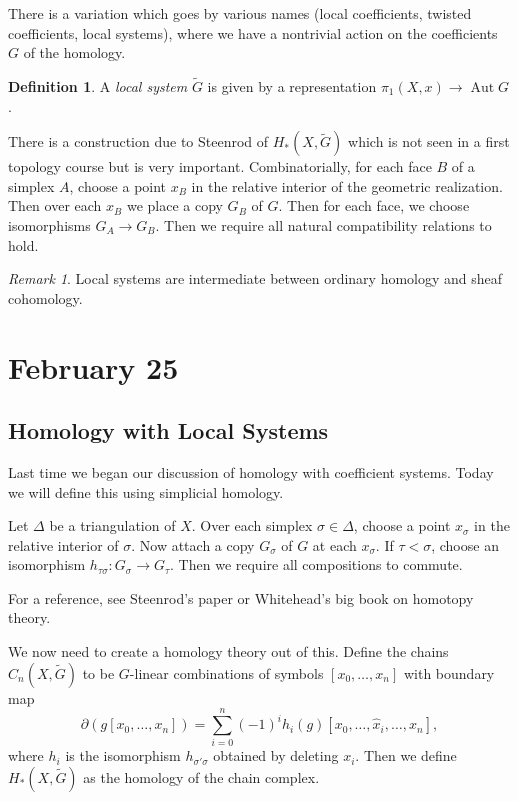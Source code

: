 \documentclass[leqno, openany]{memoir}
\theoremstyle{definition}
\newtheorem{defn}[thm]{Definition}
\theoremstyle{remark}
\newtheorem{rmk}[thm]{Remark}
\theoremstyle{plain}
\theoremstyle{definition}
\theoremstyle{remark}
\DeclareMathOperator{\Aut}{Aut}
\begin{document}
There is a variation which goes by various names (local coefficients, twisted coefficients, local systems), where we have a nontrivial action on the coefficients $G$ of the homology.

\begin{defn}
    A \textit{local system} $\widetilde{G}$ is given by a representation $\pi_1(X, x) \to \Aut G$.
\end{defn}

There is a construction due to Steenrod of $H_*(X, \widetilde{G})$ which is not seen in a first topology course but is very important. Combinatorially, for each face $B$ of a simplex $A$, choose a point $x_B$ in the relative interior of the geometric realization. Then over each $x_B$ we place a copy $G_B$ of $G$. Then for each face, we choose isomorphisms $G_A \to G_B$. Then we require all natural compatibility relations to hold.

\begin{rmk}
    Local systems are intermediate between ordinary homology and sheaf cohomology.
\end{rmk}

\chapter{February 25}%
\label{cha:february_25}

\section{Homology with Local Systems}%
\label{sec:homology_with_local_systems}

Last time we began our discussion of homology with coefficient systems. Today we will define this using simplicial homology.

Let $\Delta$ be a triangulation of $X$. Over each simplex $\sigma \in \Delta$, choose a point $x_{\sigma}$ in the relative interior of $\sigma$. Now attach a copy $G_{\sigma}$ of $G$ at each $x_{\sigma}$. If $\tau < \sigma$, choose an isomorphism $h_{\tau \sigma}: G_{\sigma} \to G_{\tau}$. Then we require all compositions to commute.

For a reference, see Steenrod's paper or Whitehead's big book on homotopy theory.

We now need to create a homology theory out of this. Define the chains $C_n(X, \widetilde{G})$ to be $G$-linear combinations of symbols $[x_0, \ldots, x_n]$ with boundary map
\[ \partial(g[x_0, \ldots, x_n]) = \sum_{i=0}^n (-1)^i h_i(g) [x_0, \ldots, \widehat{x}_i, \ldots, x_n], \]
where $h_i$ is the isomorphism $h_{\sigma'\sigma}$ obtained by deleting $x_i$. Then we define $H_*(X, \widetilde{G})$ as the homology of the chain complex.
\end{document}
